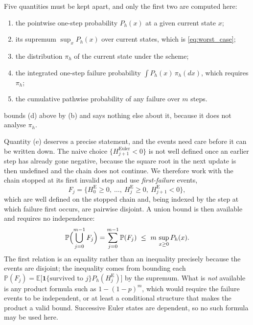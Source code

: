 \documentclass[11pt]{article}
\theoremstyle{definition}
\newcommand{\E}{\mathbb{E}}
\newcommand{\Pp}{\mathbb{P}}
\begin{document}
Five quantities must be kept apart, and only the first two are computed here:
\begin{enumerate}[label=(\alph*)]
\item the pointwise one-step probability $P_h(x)$ at a given current state $x$;
\item its supremum $\sup_xP_h(x)$ over current states, which is \eqref{eq:worst_case};
\item the distribution $\pi_h$ of the current state under the scheme;
\item the integrated one-step failure probability $\int P_h(x)\,\pi_h(dx)$, which requires $\pi_h$;
\item the cumulative pathwise probability of any failure over $m$ steps.
\end{enumerate}
 bounds (d) above by (b) and says nothing else about it, because it does not analyse $\pi_h$.

Quantity (e) deserves a precise statement, and the events need care before it can be written down. The naive choice $\{H^{\mathrm{Euler}}_{j+1}<0\}$ is not well defined once an earlier step has already gone negative, because the square root in the next update is then undefined and the chain does not continue. We therefore work with the chain stopped at its first invalid step and use \emph{first-failure} events,
\begin{equation}\label{eq:first_failure}
F_j=\bigl\{H^{\mathrm E}_0\ge0,\ \ldots,\ H^{\mathrm E}_j\ge0,\ H^{\mathrm E}_{j+1}<0\bigr\},
\end{equation}
which are well defined on the stopped chain and, being indexed by the step at which failure first occurs, are pairwise disjoint. A union bound is then available and requires no independence:
\begin{equation}\label{eq:union_bound}
\Pp\Bigl(\bigcup_{j=0}^{m-1}F_j\Bigr)=\sum_{j=0}^{m-1}\Pp(F_j)\ \le\ m\,\sup_{x\ge0}P_h(x).
\end{equation}
The first relation is an equality rather than an inequality precisely because the events are disjoint; the inequality comes from bounding each $\Pp(F_j)=\E\bigl[\mathbf 1\{\text{survived to }j\}P_h(H^{\mathrm E}_j)\bigr]$ by the supremum.
What is \emph{not} available is any product formula such as $1-(1-p)^m$, which would require the failure events to be independent, or at least a conditional structure that makes the product a valid bound. Successive Euler states are dependent, so no such formula may be used here.
\end{document}
